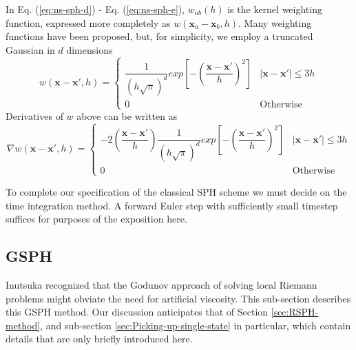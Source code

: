 \documentclass[review]{elsarticle}
\begin{document}
In Eq. (\ref{eq:ns-sph-d}) - Eq. (\ref{eq:ns-sph-e}), $w_{a b}\left(h\right)$ is the kernel
weighting function, expressed more completely as
 $w\left(\textbf{x}_a - \textbf{x}_b, h\right)$. 
Many  weighting functions have been proposed, but, for simplicity,  we 
employ a truncated Gaussian in $d$ dimensions
\begin{equation}
w\left(\textbf{x} - \textbf{x} \prime, h \right) = 
\begin{cases} 
      \dfrac{1}{\left(h \sqrt{\pi}\right)^d} exp \left[- \left(\dfrac{\textbf{x} - \textbf{x} \prime}{h} \right)^2 \right] &  \vert \textbf{x} - \textbf{x} \prime \vert \leq 3h\\
      0 & \text{Otherwise}
\end{cases}
\label{eq:SPH-kernel}
\end{equation}
Derivatives of $w$ above can be written as 
\begin{equation}
\nabla w\left(\textbf{x} - \textbf{x} \prime, h \right) = 
\begin{cases} 
      -2\left(\dfrac{\textbf{x} - \textbf{x} \prime}{h}\right) \dfrac{1}{\left(h \sqrt{\pi}\right)^d} exp \left[- \left(\dfrac{\textbf{x} - \textbf{x} \prime}{h}\right)^2 \right] &  \vert \textbf{x} - \textbf{x} \prime \vert \leq 3h\\
      0 & \text{Otherwise}
\end{cases}
\label{eq:SPH-kernel-gradient}
\end{equation}

To complete our specification of the classical SPH scheme we must decide on the time 
integration method. A forward Euler step with sufficiently small timestep suffices for purposes of the exposition
here.

\subsection{GSPH} \label{sec:GSPH-method}
Inutsuka \cite{inutsuka2002reformulation} recognized that the Godunov approach of 
solving local Riemann problems might obviate the need for artificial viscosity.  This sub-section 
describes this GSPH method. Our discussion  anticipates that of
Section \ref{sec:RSPH-method}, and sub-section \ref{sec:Picking-up-single-state}
 in particular, which contain details that are only briefly
introduced here.
\end{document}
